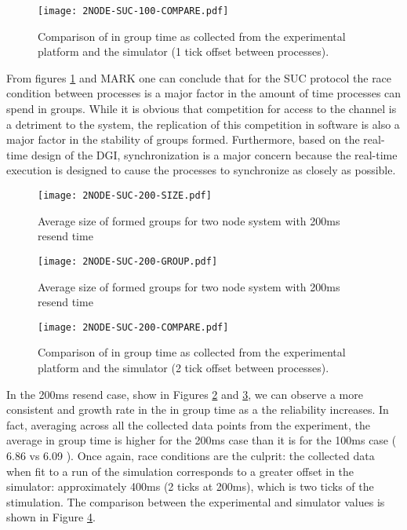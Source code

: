 \begin{figure}[!h]
\centering
\texttt{[image: 2NODE-SUC-100-COMPARE.pdf]}
\caption{Comparison of in group time as collected from the experimental platform and the simulator (1 tick offset between processes).}
\label{fig:COMPARE-SUC-2NODE-100}
\end{figure}

From figures \ref{fig:COMPARE-SUC-2NODE-100} and MARK one can conclude that for the SUC protocol the 
race condition between processes is a major factor in the amount of time processes
can spend in groups. While it is obvious that competition for access to the channel
is a detriment to the system, the replication of this competition in software is
also a major factor in the stability of groups formed. Furthermore, based on the 
real-time design of the DGI, synchronization is a major concern because the real-time
execution is designed to cause the processes to synchronize as closely as possible.

\begin{figure}[!h]
\centering
\texttt{[image: 2NODE-SUC-200-SIZE.pdf]}
\caption{Average size of formed groups for two node system with 200ms resend time}
\label{fig:MGS-SUC-2NODE-200}
\end{figure}

\begin{figure}[!h]
\centering
\texttt{[image: 2NODE-SUC-200-GROUP.pdf]}
\caption{Average size of formed groups for two node system with 200ms resend time}
\label{fig:IGT-SUC-2NODE-200}
\end{figure}

\begin{figure}[!h]
\centering
\texttt{[image: 2NODE-SUC-200-COMPARE.pdf]}
\caption{Comparison of in group time as collected from the experimental platform and the simulator (2 tick offset between processes).}
\label{fig:COMPARE-SUC-2NODE-200}
\end{figure}


In the 200ms resend case, show in Figures \ref{fig:MGS-SUC-2NODE-200} and \ref{fig:IGT-SUC-2NODE-200}, we can observe a more consistent and
growth rate in the in group time as a the reliability increases. In fact, averaging
across all the collected data points from the experiment, the average in group time
is higher for the 200ms case than it is for the 100ms case ( 6.86 vs 6.09 ). Once
again, race conditions are the culprit: the collected data when fit to a run of the
simulation corresponds to a greater offset in the simulator: approximately 400ms (2 ticks at 200ms),
which is two ticks of the stimulation. The comparison between the experimental and
simulator values is shown in Figure \ref{fig:COMPARE-SUC-2NODE-200}.

